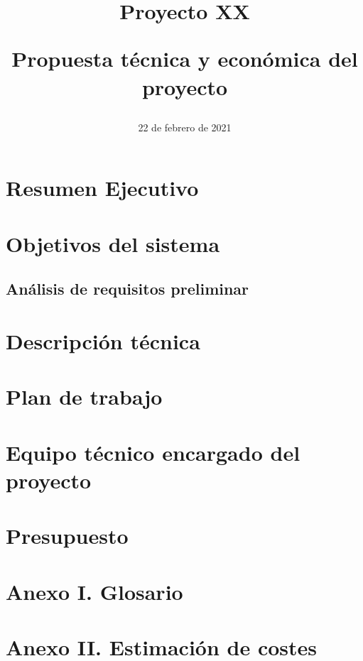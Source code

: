 \documentclass{article}
\title{
\Huge{Proyecto XX} \\ 
\begin{Large} 
Propuesta técnica y económica del proyecto
\end{Large}}
\date{22 de febrero de 2021}
\begin{document}
\maketitle

\pagebreak 

\tableofcontents

\pagebreak

\section{Resumen Ejecutivo}

\section{Objetivos del sistema}

\subsection{Análisis de requisitos preliminar}

\section{Descripción técnica}

\section{Plan de trabajo}

\section{Equipo técnico encargado del proyecto}

\section{Presupuesto}

\section*{Anexo I. Glosario}

\section*{Anexo II. Estimación de costes}

\end{document}
